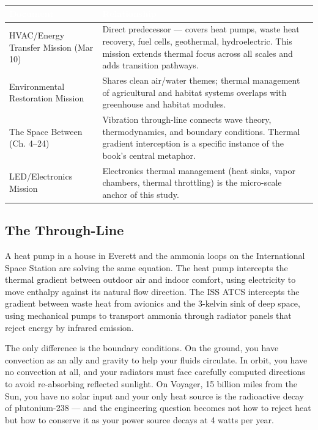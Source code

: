 \documentclass[11pt,letterpaper]{article}
\newcommand{\tableheader}[1]{\textbf{\sffamily\textcolor{white}{#1}}}
\begin{document}
\begin{center}
\begin{tabularx}{\textwidth}{L{4cm}X}
\toprule
{}
\tableheader{Document} & \tableheader{Relationship} \\
\midrule
HVAC/Energy Transfer Mission (Mar 10) & Direct predecessor --- covers heat pumps, waste heat recovery, fuel cells, geothermal, hydroelectric. This mission extends thermal focus across all scales and adds transition pathways. \\
Environmental Restoration Mission & Shares clean air/water themes; thermal management of agricultural and habitat systems overlaps with greenhouse and habitat modules. \\
The Space Between (Ch. 4--24) & Vibration through-line connects wave theory, thermodynamics, and boundary conditions. Thermal gradient interception is a specific instance of the book's central metaphor. \\
LED/Electronics Mission & Electronics thermal management (heat sinks, vapor chambers, thermal throttling) is the micro-scale anchor of this study. \\
\bottomrule
\end{tabularx}
\end{center}

\subsection{The Through-Line}

A heat pump in a house in Everett and the ammonia loops on the International Space Station are solving the same equation. The heat pump intercepts the thermal gradient between outdoor air and indoor comfort, using electricity to move enthalpy against its natural flow direction. The ISS ATCS intercepts the gradient between waste heat from avionics and the 3-kelvin sink of deep space, using mechanical pumps to transport ammonia through radiator panels that reject energy by infrared emission.

The only difference is the boundary conditions. On the ground, you have convection as an ally and gravity to help your fluids circulate. In orbit, you have no convection at all, and your radiators must face carefully computed directions to avoid re-absorbing reflected sunlight. On Voyager, 15 billion miles from the Sun, you have no solar input and your only heat source is the radioactive decay of plutonium-238 --- and the engineering question becomes not how to reject heat but how to conserve it as your power source decays at 4 watts per year.
\end{document}

